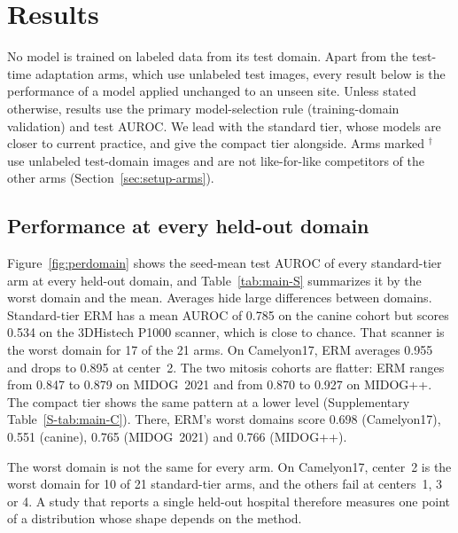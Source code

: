 \section{Results}
\label{sec:results}

No model is trained on labeled data from its test domain. Apart from the
test-time adaptation arms, which use unlabeled test images, every result below
is the performance of a model applied unchanged to an unseen site.
Unless stated otherwise, results use the primary model-selection rule
(training-domain validation) and test AUROC. We lead with the standard tier,
whose models are closer to current practice, and give the compact tier
alongside. Arms marked $^{\dagger}$ use unlabeled test-domain images and are
not like-for-like competitors of the other arms
(Section~\ref{sec:setup-arms}).

\subsection{Performance at every held-out domain}
\label{sec:results-domains}

Figure~\ref{fig:perdomain} shows the seed-mean test AUROC of every
standard-tier arm at every held-out domain, and Table~\ref{tab:main-S}
summarizes it by the worst domain and the mean. Averages hide large
differences between domains. Standard-tier ERM has a mean AUROC of 0.785 on
the canine cohort but scores 0.534 on the 3DHistech P1000 scanner, which is
close to chance. That scanner is the worst domain for 17 of the 21 arms. On
Camelyon17, ERM averages 0.955 and drops to 0.895 at center~2. The two mitosis
cohorts are flatter: ERM ranges from 0.847 to 0.879 on MIDOG~2021 and from
0.870 to 0.927 on MIDOG++. The compact tier shows the same pattern at a lower
level (Supplementary Table~\ref{S-tab:main-C}). There, ERM's worst domains score
0.698 (Camelyon17), 0.551 (canine), 0.765 (MIDOG~2021) and 0.766 (MIDOG++).

The worst domain is not the same for every arm. On Camelyon17, center~2 is the
worst domain for 10 of 21 standard-tier arms, and the others fail at
centers~1, 3 or 4. A study that reports a single held-out hospital therefore
measures one point of a distribution whose shape depends on the method.


